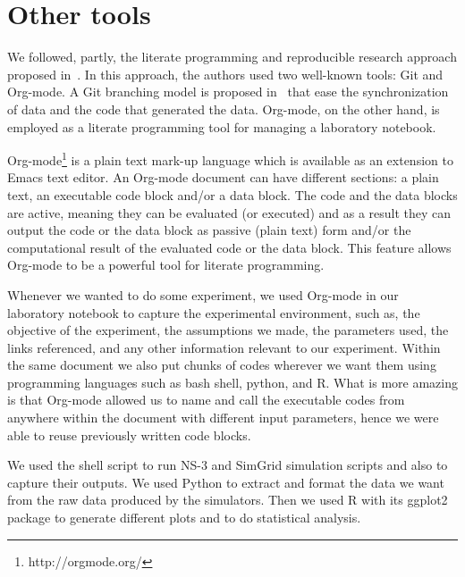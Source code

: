 \section{Other tools}
We followed, partly, the literate programming and reproducible research approach proposed in~\cite{DBLP:journals/sigops/StanisicLD15,schulte2012multi}. In this approach, the authors used two well-known tools: Git and Org-mode. A Git branching model is proposed in~\cite{DBLP:journals/sigops/StanisicLD15} that ease the synchronization of data and the code that generated the data. Org-mode, on the other hand, is employed as a literate programming tool for managing a laboratory notebook.  

Org-mode\footnote{http://orgmode.org/} is a plain text mark-up language which is available as an extension to Emacs text editor. An Org-mode document can have different sections: a plain text, an executable code block and/or a data block. The code and the data blocks are active, meaning they can be evaluated (or executed) and as a result they can output the code or the data block as passive (plain text) form and/or the computational result of the evaluated code or the data block. This feature allows Org-mode to be a powerful tool for literate programming.

Whenever we wanted to do some experiment, we used Org-mode in our laboratory notebook to capture the experimental environment, such as, the objective of the experiment, the assumptions we made, the parameters used, the links referenced, and any other information relevant to our experiment. Within the same document we also put chunks of codes wherever we want them using programming languages such as bash shell, python, and R. What is more amazing is that Org-mode allowed us to name and call the executable codes from anywhere within the document with different input parameters, hence we were able to reuse previously written code blocks. 

We used the shell script to run NS-3 and SimGrid simulation scripts and also to capture their outputs. We used Python to extract and format the data we want from the raw data produced by the simulators. Then we used R with its ggplot2 package to generate different plots and to do statistical analysis.


